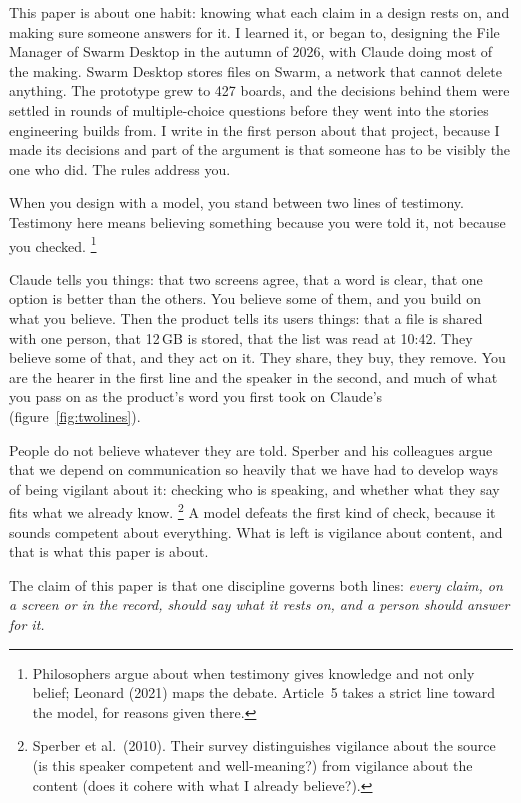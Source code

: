 \documentclass[11pt,a4paper]{article}
\newcommand{\KeepLines}[1]{\par\vskip 0pt plus #1\baselineskip\penalty-200\vskip 0pt plus -#1\baselineskip}
\newcommand{\Head}[1]{%
  \KeepLines{6}\vspace{6mm}{\large\itshape #1}\par\vspace{2mm}\noindent\ignorespaces}
\newcounter{art}
\begin{document}
\noindent This paper is about one habit: knowing what each claim in a design rests on, and making sure someone answers for it. I learned it, or began to, designing the File Manager of Swarm Desktop in the autumn of 2026, with Claude doing most of the making. Swarm Desktop stores files on Swarm, a network that cannot delete anything. The prototype grew to 427 boards, and the decisions behind them were settled in rounds of multiple-choice questions before they went into the stories engineering builds from. I write in the first person about that project, because I made its decisions and part of the argument is that someone has to be visibly the one who did. The rules address you.

\Head{Two lines of testimony}
When you design with a model, you stand between two lines of testimony. Testimony here means believing something because you were told it, not because you checked.%
\footnote{Philosophers argue about when testimony gives knowledge and not only belief; Leonard (2021) maps the debate. Article~5 takes a strict line toward the model, for reasons given there.}

Claude tells you things: that two screens agree, that a word is clear, that one option is better than the others. You believe some of them, and you build on what you believe. Then the product tells its users things: that a file is shared with one person, that 12\,GB is stored, that the list was read at 10:42. They believe some of that, and they act on it. They share, they buy, they remove. You are the hearer in the first line and the speaker in the second, and much of what you pass on as the product's word you first took on Claude's (figure~\ref{fig:twolines}).

People do not believe whatever they are told. Sperber and his colleagues argue that we depend on communication so heavily that we have had to develop ways of being vigilant about it: checking who is speaking, and whether what they say fits what we already know.%
\footnote{Sperber et al.\ (2010). Their survey distinguishes vigilance about the source (is this speaker competent and well-meaning?) from vigilance about the content (does it cohere with what I already believe?).}
A model defeats the first kind of check, because it sounds competent about everything. What is left is vigilance about content, and that is what this paper is about.

The claim of this paper is that one discipline governs both lines: \emph{every claim, on a screen or in the record, should say what it rests on, and a person should answer for it.}
\end{document}
